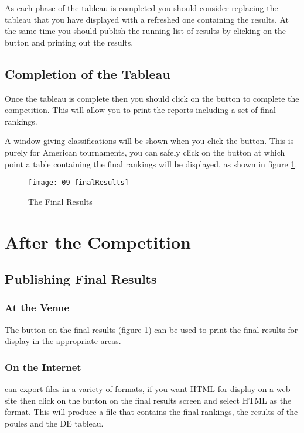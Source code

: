 \documentclass[a4paper,11pt]{memoir}
\begin{document}
As each phase of the tableau is completed you should consider replacing the tableau that you have displayed with a refreshed one containing the results. At the same time you should publish the running list of results by clicking on the  button and printing out the results. 

\section{Completion of the Tableau}

Once the tableau is complete then you should click on the  button to complete the competition. This will allow you to print the reports including a set of final rankings. 

A window giving classifications will be shown when you click the  button. This is purely for American tournaments, you can safely click on the  button at which point a table containing the final rankings will be displayed, as shown in figure \ref{fig:09-finalResults}.

\begin{figure}[!ht]
 \centering
 \texttt{[image: 09-finalResults]}
 \caption{The Final Results} \label{fig:09-finalResults}
\end{figure}

\chapter{After the Competition}

\section{Publishing Final Results}

\subsection{At the Venue}

The  button on the final results (figure \ref{fig:09-finalResults}) can be used to print the final results for display in the appropriate areas. 

\subsection{On the Internet}

\fencingtime{} can export files in a variety of formats, if you want HTML for display on a web site then click on the  button on the final results screen and select HTML as the format. This will produce a file that contains the final rankings, the results of the poules and the DE tableau. 
\end{document}
